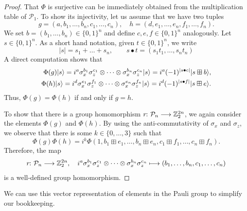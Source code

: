 \documentclass[a4paper, oneside, 12pt]{amsart}
\newcommand*{\PauliGroup}{\ensuremath{\mathcal{P}}}
\begin{document}
\begin{proof}
  That \( \Phi \) is surjective can be immediately obtained from the multiplication table of \( \PauliGroup_1 \).
  To
  show its injectivity, let us assume that we have two tuples
  \begin{equation*}
    g = (a, b_1, \dots, b_n, c_1, \dots, c_n), \quad h = (d, e_1, \dots, e_n, f_1, \dots, f_n).
  \end{equation*}
  We set \(b= (b_{1}, \dots , b_{n})\in\{0,1\}^{n}\) and define \(c,e,f\in\{0,1\}^{n}\) analogously.
  Let \( s \in \{0,1\}^n \).
  As a short hand notation, given \(t \in\{0,1\}^{n}\), we write
  \begin{equation*}
    |s| = s_{1} + \dots+ s_{n}, \qquad s\bullet t = (s_{1}t_{1}, \dots, s_{n}t_{n})
  \end{equation*}
  A direct computation shows that
  \begin{align*}
    \Phi(g) \lvert s\rangle = i^a \sigma_x^{b_1} \sigma_z^{c_1} \otimes \dots \otimes \sigma_x^{b_n} \sigma_z^{c_n} \lvert s\rangle = i^{a} (-1)^{|s\bullet c|}\lvert s\boxplus b\rangle, \\
    \Phi(h) \lvert s\rangle = i^d \sigma_x^{e_1} \sigma_z^{f_1} \otimes \dots \otimes \sigma_x^{e_n} \sigma_z^{f_n} \lvert s\rangle = i^{d} (-1)^{|s\bullet f|}\lvert s\boxplus e\rangle.
  \end{align*}
  Thus, \( \Phi(g) = \Phi(h) \) if and only if \( g = h \).

  To show that there is a group homomorphism \( r \from \PauliGroup_n \to \mathbb{Z}_2^{2n} \), we again consider the elements \( \Phi(g) \) and \( \Phi(h) \).
  By using the anti-commutativity of \( \sigma_x \) and \( \sigma_z \), we observe that there is some \( k \in \{0, \dots, 3\} \) such that
  \begin{equation*}
    \Phi(g) \Phi(h) = i^k \Phi(1, b_1 \boxplus e_1, \dots, b_n \boxplus e_n, c_1 \boxplus f_1, \dots, c_n \boxplus f_n).
  \end{equation*}
  Therefore, the map
  \begin{equation*}
      r \from \PauliGroup_n \to \mathbb{Z}_2^{2n}, \quad i^a \sigma_x^{b_1} \sigma_z^{c_1} \otimes \dots \otimes \sigma_x^{b_n} \sigma_z^{c_n} \mapsto (b_1, \dots, b_n, c_1, \dots, c_n)
  \end{equation*}
  is a well-defined group homomorphism.
\end{proof}

We can use this vector representation of elements in the Pauli group to simplify our bookkeeping.
\end{document}
